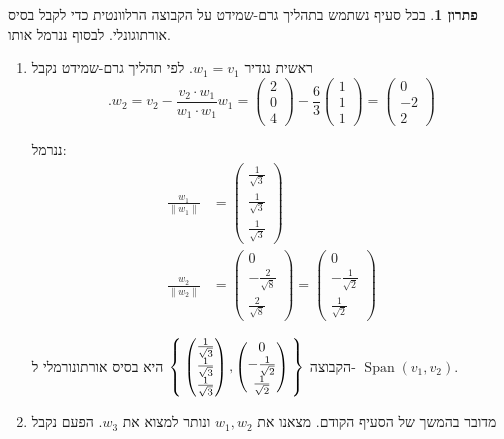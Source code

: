 \documentclass[12pt]{report}
\theoremstyle{plain}
\theoremstyle{definition}
\newtheorem*{solution}{פתרון}
\newcommand{\0}{\mathbf{0}}
\DeclareMathOperator{\Span}{Span}
\begin{document}
\begin{solution}
בכל סעיף נשתמש בתהליך גרם-שמידט על הקבוצה הרלוונטית כדי לקבל בסיס אורתוגונלי. לבסוף ננרמל אותו.

\begin{enumerate}[label=\alph*.]
\item 
ראשית נגדיר
$w_1=v_1$.
לפי תהליך גרם-שמידט נקבל
$$
.w_2=v_2-\frac{v_2\cdot w_1}{w_1\cdot w_1}w_1=\begin{pmatrix}2\\0\\4\end{pmatrix}-\frac{6}{3}\begin{pmatrix}1\\1\\1\end{pmatrix}=\begin{pmatrix}0\\-2\\2\end{pmatrix}
$$

ננרמל:
$$
\begin{aligned}
\frac{w_1}{\|w_1\|}&=\begin{pmatrix}\frac{1}{\sqrt{3}} \\ \frac{1}{\sqrt{3}} \\ \frac{1}{\sqrt{3}}\end{pmatrix}\\
\frac{w_2}{\|w_2\|}&=\begin{pmatrix}0\\-\frac{2}{\sqrt{8}}\\\frac{2}{\sqrt{8}}\end{pmatrix}=\begin{pmatrix}0\\-\frac{1}{\sqrt{2}}\\\frac{1}{\sqrt{2}}\end{pmatrix}
\end{aligned}
$$

הקבוצה 
$\Set{\begin{pmatrix}\frac{1}{\sqrt{3}} \\ \frac{1}{\sqrt{3}} \\ \frac{1}{\sqrt{3}}\end{pmatrix},\begin{pmatrix}0\\-\frac{1}{\sqrt{2}}\\\frac{1}{\sqrt{2}}\end{pmatrix}}$
היא בסיס אורתונורמלי ל-
$\Span(v_1,v_2)$.


\item 
מדובר בהמשך של הסעיף הקודם. מצאנו את
$w_1,w_2$
ונותר למצוא את 
$w_3$.
הפעם נקבל


\end{enumerate}
\end{solution}
\end{document}
